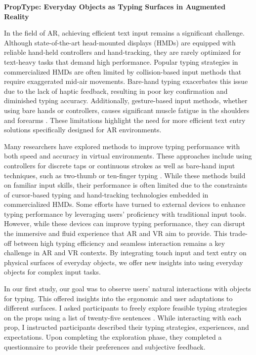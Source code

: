\documentclass[12pt, letterpaper, twocolumn]{article}
\begin{document}
	
	\begin{center}
		\textbf{PropType: Everyday Objects as Typing Surfaces in Augmented Reality}
	\end{center}
	
	
	In the field of AR, achieving efficient text input remains a significant challenge. Although state-of-the-art head-mounted displays (HMDs) are equipped with reliable hand-held controllers and hand-tracking, they are rarely optimized for text-heavy tasks that demand high performance. Popular typing strategies in commercialized HMDs \cite{speicher2018selectionbased, xu2019pointSelectMethodsAR, Luong_2023_ControllersorBareHands} are often limited by collision-based input methods that require exaggerated mid-air movements. Bare-hand typing exacerbates this issue due to the lack of haptic feedback, resulting in poor key confirmation and diminished typing accuracy. Additionally, gesture-based input methods, whether using bare hands or controllers, causes significant muscle fatigue in the shoulders and forearms \cite{hansberger2017gorillaarm}. These limitations highlight the need for more efficient text entry solutions specifically designed for AR environments. 
	
	Many researchers have explored methods to improve typing performance with both speed and accuracy in virtual environments. These approaches include using controllers for discrete taps or continuous strokes as well as bare-hand input techniques, such as two-thumb or ten-finger typing \cite{Kim_2023_STAR, speicher2018selectionbased, Yu_et_al_2018}. While these methods build on familiar input skills, their performance is often limited due to the constraints of cursor-based typing and hand-tracking technologies embedded in commercialized HMDs. Some efforts have turned to external devices to enhance typing performance by leveraging users' proficiency with traditional input tools. However, while these devices can improve typing performance, they can disrupt the immersive and fluid experience that AR and VR aim to provide. This trade-off between high typing efficiency and seamless interaction remains a key challenge in AR and VR contexts. By integrating touch input and text entry on physical surfaces of everyday objects, we offer new insights into using everyday objects for complex input tasks.
	
	In our first study, our goal was to observe users' natural interactions with objects for typing. This offered insights into the ergonomic and user adaptations to different surfaces. I asked participants to freely explore feasible typing strategies on the props using a list of twenty-five sentences \cite{MacKenzie_2003_Phrases}. While interacting with each prop, I instructed participants described their typing strategies, experiences, and expectations. Upon completing the exploration phase, they completed a questionnaire to provide their preferences and subjective feedback. 
	
\end{document}

